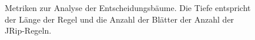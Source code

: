 \begin{figure}[h]
    \begin{floatrow}
         {
            \caption{Metriken zur Analyse der Entscheidungsbäume. Die Tiefe entspricht der Länge der Regel und die Anzahl der Blätter der Anzahl der JRip-Regeln.}
            \label{figure:algorithms_J48}
        }

\end{floatrow}
\end{figure}
